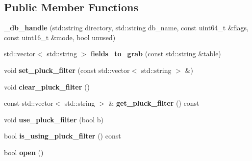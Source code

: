 \subsection*{Public Member Functions}
\begin{DoxyCompactItemize}
\item 
\mbox{\label{structmods_1_1lmdb_1_1__db__handle_a85925e9d8d0e168f64a9db2a95328e69}} 
{\bfseries \+\_\+db\+\_\+handle} (std\+::string directory, std\+::string db\+\_\+name, const uint64\+\_\+t \&flags, const uint16\+\_\+t \&mode, bool unused)
\item 
\mbox{\label{structmods_1_1lmdb_1_1__db__handle_a131a1099a47fc324190bacaeb984cd33}} 
std\+::vector$<$ std\+::string $>$ {\bfseries fields\+\_\+to\+\_\+grab} (const std\+::string \&table)
\item 
\mbox{\label{structmods_1_1lmdb_1_1__db__handle_a89d952ebde51897bf5677a570cb6ec42}} 
void {\bfseries set\+\_\+pluck\+\_\+filter} (const std\+::vector$<$ std\+::string $>$ \&)
\item 
\mbox{\label{structmods_1_1lmdb_1_1__db__handle_a08f55815fcfda198243ad56f6c6c77d5}} 
void {\bfseries clear\+\_\+pluck\+\_\+filter} ()
\item 
\mbox{\label{structmods_1_1lmdb_1_1__db__handle_ad5ac6cd8bed5f6330b1fecf8f9a55f8e}} 
const std\+::vector$<$ std\+::string $>$ \& {\bfseries get\+\_\+pluck\+\_\+filter} () const
\item 
\mbox{\label{structmods_1_1lmdb_1_1__db__handle_abc6d0f79407e4bc1893dedd4005d214c}} 
void {\bfseries use\+\_\+pluck\+\_\+filter} (bool b)
\item 
\mbox{\label{structmods_1_1lmdb_1_1__db__handle_ae6943acbfe888c2e2d0cd58ac2d8ec3d}} 
bool {\bfseries is\+\_\+using\+\_\+pluck\+\_\+filter} () const
\item 
\mbox{\label{structmods_1_1lmdb_1_1__db__handle_a804027c6192e3b7139482749c75f8ee3}} 
bool {\bfseries open} ()

\end{DoxyCompactItemize}
